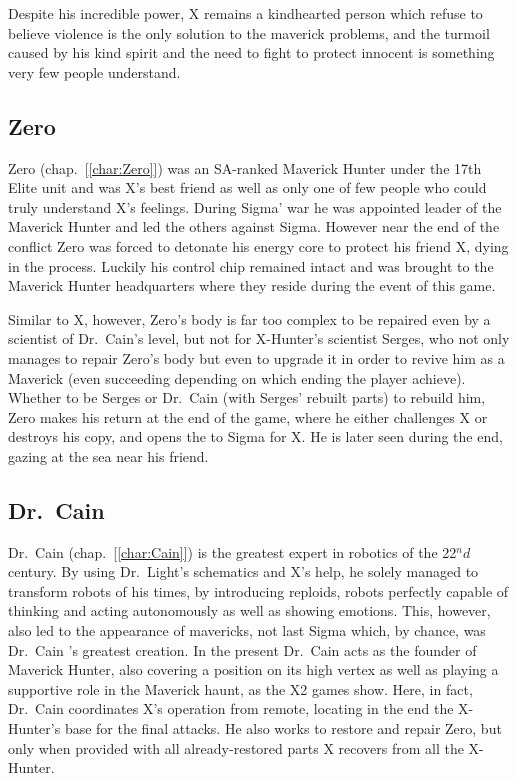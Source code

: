 Despite his incredible power, X remains a kindhearted person which refuse to believe violence is the only solution to the maverick problems, and the turmoil caused by his kind spirit and the need to fight to protect innocent is something very few people understand\cite{Xcoll1:Manual_X2}.

\subsection{Zero}
Zero (chap.~[\ref{char:Zero}]) was an SA-ranked Maverick Hunter under the 17th Elite unit and was X's best friend as well as only one of few people who could truly understand X's feelings. During Sigma' war he was appointed leader of the Maverick Hunter and led the others against Sigma. However near the end of the conflict Zero was forced to detonate his energy core to protect his friend X, dying in the process. Luckily his control chip remained intact and was brought to the Maverick Hunter headquarters where they reside during the event of this game.

Similar to X, however, Zero's body is far too complex to be repaired even by a scientist of Dr.~Cain's level, but not for X-Hunter's scientist Serges, who not only manages to repair Zero's body but even to upgrade it in order to revive him as a Maverick\cite{wayback:X2_resources} (even succeeding depending on which ending the player achieve). Whether to be Serges or Dr.~Cain (with Serges' rebuilt parts) to rebuild him, Zero makes his return at the end of the game, where he either challenges X or destroys his copy, and opens the to Sigma for X. He is later seen during the end, gazing at the sea near his friend.


\subsection{Dr.~Cain}
Dr.~Cain (chap.~[\ref{char:Cain}]) is the greatest expert in robotics of the 22$^nd$ century\cite{Xcoll1:Manual_X2}. By using Dr.~Light's schematics and X's help, he solely managed to transform robots of his times, by introducing reploids, robots perfectly capable of thinking and acting autonomously as well as showing emotions. This, however, also led to the appearance of mavericks, not last Sigma which, by chance, was Dr.~Cain 's greatest creation. In the present Dr.~Cain acts as the founder of Maverick Hunter, also covering a position on its high vertex as well as playing a supportive role in the Maverick haunt, as the X2 games show. Here, in fact, Dr.~Cain coordinates X's operation from remote, locating in the end the X-Hunter's base for the final attacks. He also works to restore and repair Zero, but only when provided with all already-restored parts X recovers from all the X-Hunter.

